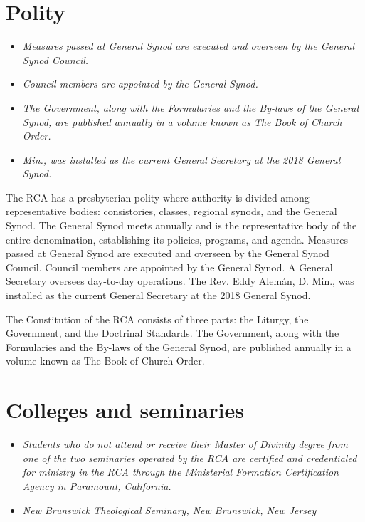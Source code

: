 \section{Polity}\label{polity}

\begin{itemize}
\item
  \emph{Measures passed at General Synod are executed and overseen by
  the General Synod Council.}
\item
  \emph{Council members are appointed by the General Synod.}
\item
  \emph{The Government, along with the Formularies and the By-laws of
  the General Synod, are published annually in a volume known as The
  Book of Church Order.}
\item
  \emph{Min., was installed as the current General Secretary at the 2018
  General Synod.}
\end{itemize}

The RCA has a presbyterian polity where authority is divided among
representative bodies: consistories, classes, regional synods, and the
General Synod. The General Synod meets annually and is the
representative body of the entire denomination, establishing its
policies, programs, and agenda. Measures passed at General Synod are
executed and overseen by the General Synod Council. Council members are
appointed by the General Synod. A General Secretary oversees day-to-day
operations. The Rev. Eddy Alemán, D. Min., was installed as the current
General Secretary at the 2018 General Synod.

The Constitution of the RCA consists of three parts: the Liturgy, the
Government, and the Doctrinal Standards. The Government, along with the
Formularies and the By-laws of the General Synod, are published annually
in a volume known as The Book of Church Order.

\section{Colleges and seminaries}\label{colleges-and-seminaries}

\begin{itemize}
\item
  \emph{Students who do not attend or receive their Master of Divinity
  degree from one of the two seminaries operated by the RCA are
  certified and credentialed for ministry in the RCA through the
  Ministerial Formation Certification Agency in Paramount, California.}
\item
  \emph{New Brunswick Theological Seminary, New Brunswick, New Jersey}
\end{itemize}

